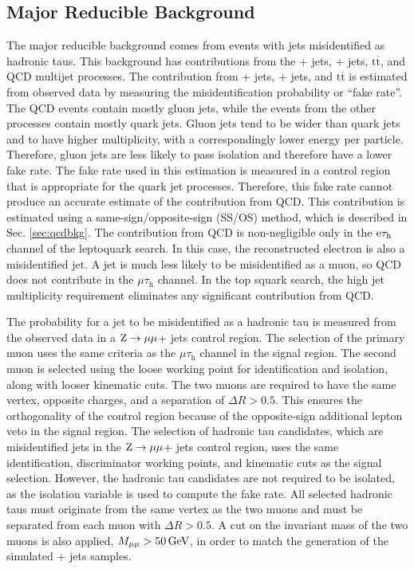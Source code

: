 \documentclass[12pt]{thesis}  %
\newcommand{\tauh}{\ensuremath{\tau_{\text{h}}}\xspace}
\newcommand{\Pe}{\ensuremath{\cmsSymbolFace{e}}\xspace}
\newcommand{\mutau}{\ensuremath{\mu\tauh}\xspace}
\newcommand{\etau}{\ensuremath{\Pe\tauh}\xspace}
\renewcommand{\ttbar}{\ensuremath{\mathrm{t}\overline{\mathrm{t}}}\xspace}
\newcommand{\ra}{\ensuremath{\rightarrow}}%
\newcommand{\Zmm}{\ensuremath{\Z \ra \mu\mu}\xspace}%
\begin{document}
\subsection{Major Reducible Background
\label{sec:faketaubkg}}

The major reducible background comes from events with jets misidentified as hadronic taus. This background has contributions from the \W + jets, \Z + jets, \ttbar, and QCD multijet processes. The contribution from \W + jets, \Z + jets, and \ttbar is estimated from observed data by measuring the misidentification probability or ``fake rate''. The QCD events contain mostly gluon jets, while the events from the other processes contain mostly quark jets. Gluon jets tend to be wider than quark jets and to have higher multiplicity, with a correspondingly lower energy per particle. Therefore, gluon jets are less likely to pass isolation and therefore have a lower fake rate. The fake rate used in this estimation is measured in a control region that is appropriate for the quark jet processes. Therefore, this fake rate cannot produce an accurate estimate of the contribution from QCD. This contribution is estimated using a same-sign/opposite-sign (SS/OS) method, which is described in Sec. \ref{sec:qcdbkg}. The contribution from QCD is non-negligible only in the \etau channel of the leptoquark search. In this case, the reconstructed electron is also a misidentified jet. A jet is much less likely to be misidentified as a muon, so QCD does not contribute in the \mutau channel. In the top squark search, the high jet multiplicity requirement eliminates any significant contribution from QCD.

The probability for a jet to be misidentified as a hadronic tau is measured from the observed data in a \Zmm + jets control region. The selection of the primary muon uses the same criteria as the \mutau channel in the signal region. The second muon is selected using the loose working point for identification and isolation, along with looser kinematic cuts. The two muons are required to have the same vertex, opposite charges, and a separation of $\Delta R > 0.5$. This ensures the orthogonality of the control region because of the opposite-sign additional lepton veto in the signal region. The selection of hadronic tau candidates, which are misidentified jets in the \Zmm + jets control region, uses the same identification, discriminator working points, and kinematic cuts as the signal selection. However, the hadronic tau candidates are not required to be isolated, as the isolation variable is used to compute the fake rate. All selected hadronic taus must originate from the same vertex as the two muons and must be separated from each muon with $\Delta R > 0.5$. A cut on the invariant mass of the two muons is also applied, $M_{\mu\mu} > 50\,\text{Ge\hspace{-.08em}V}$, in order to match the generation of the simulated \Z + jets samples.
\end{document}

